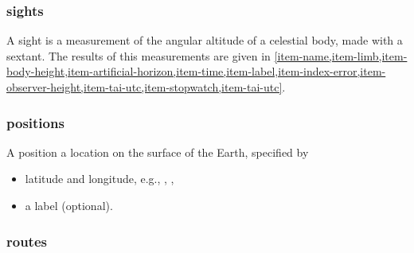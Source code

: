\documentclass{ol-softwaremanual}
\begin{document}
\subsubsection{\Glspl{sight}} \label{section-sights} 

A \gls{sight} is a measurement of the angular altitude of a celestial \gls{body}, made with a \gls{sextant}. 
The results of this measurements are given in  \cref{item-name,item-limb,item-body-height,item-artificial-horizon,item-time,item-label,item-index-error,item-observer-height,item-tai-utc,item-stopwatch,item-tai-utc}. 



\subsubsection{\Glspl{position}}  \label{section-positions} 

A \gls{position} a  location on the surface of the Earth, specified by 
\begin{itemize}
\item latitude and longitude, e.g., , ,
\item a label (optional).
\end{itemize}
\subsubsection{\Glspl{route}} \label{section-routes} 
\end{document}
